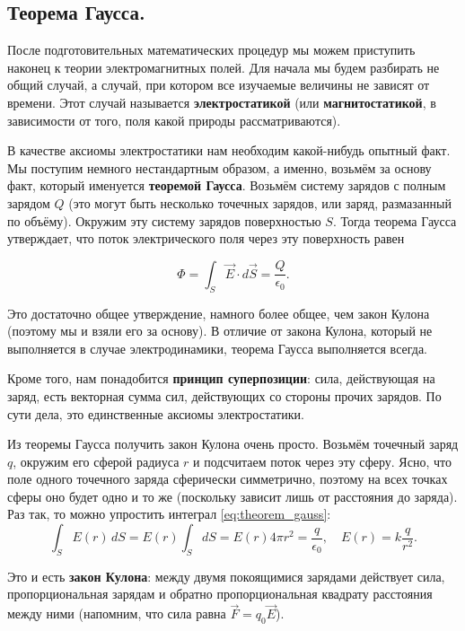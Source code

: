 \documentclass[12pt,a4paper]{article}
\numberwithin{equation}{section}
\numberwithin{equation}{section}
\newcommand{\eps}{\epsilon}
\begin{document}
\subsection{Теорема Гаусса.}
\label{sec:coulomb}

После подготовительных математических процедур мы можем приступить
наконец к теории электромагнитных полей. Для начала мы будем разбирать
не общий случай, а случай, при котором все изучаемые величины не
зависят от времени. Этот случай называется \textbf{электростатикой} (или
\textbf{магнитостатикой}, в зависимости от того, поля какой природы
рассматриваются). 

В качестве аксиомы электростатики нам необходим какой-нибудь опытный
факт. Мы поступим немного нестандартным образом, а именно, возьмём за
основу факт, который именуется \textbf{теоремой Гаусса}. Возьмём
систему зарядов с полным зарядом $Q$ (это могут быть несколько
точечных зарядов, или заряд, размазанный по объёму). Окружим эту
систему зарядов поверхностью $S$. Тогда теорема Гаусса утверждает, что
поток электрического поля через эту поверхность равен

\begin{equation}
  \label{eq:theorem_gauss}
  \Phi = \int_S \vec{E} \cdot d\vec{S} = \frac{Q}{\epsilon_0}.
\end{equation}

Это достаточно общее утверждение, намного более общее, чем закон
Кулона (поэтому мы и взяли его за основу). В отличие от закона Кулона,
который не выполняется в случае электродинамики, теорема Гаусса
выполняется всегда. 

Кроме того, нам понадобится \textbf{принцип суперпозиции}: сила,
действующая на заряд, есть векторная сумма сил, действующих со стороны
прочих зарядов. По сути дела, это единственные аксиомы электростатики.

Из теоремы Гаусса получить закон Кулона очень просто. Возьмём точечный
заряд $q$, окружим его сферой радиуса $r$ и подсчитаем поток через эту
сферу. Ясно, что поле одного точечного заряда сферически симметрично,
поэтому на всех точках сферы оно будет одно и то же (поскольку зависит
лишь от расстояния до заряда). Раз так, то можно упростить интеграл
\eqref{eq:theorem_gauss}: 
\begin{equation}
  \label{eq:law_coulomb}
  \int_S E(r)\, dS = E(r) \int_S dS = E(r) 4\pi r^2 =
  \frac{q}{\eps_0}, \quad E(r) = k\frac{q}{r^2}.
\end{equation}

Это и есть \textbf{закон Кулона}: между двумя покоящимися зарядами
действует сила, пропорциональная зарядам и обратно пропорциональная
квадрату расстояния между ними (напомним, что сила равна $\vec{F} = q_0
\vec{E}$).
\end{document}
